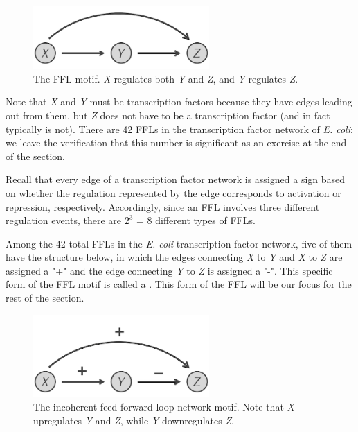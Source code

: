 \begin{figure}[h]
\centering
\mySfFamily
\includegraphics[width = 0.6\textwidth]{../assets/images/600px/feed-forward_loop.png}
\caption{The FFL motif. \textit{X} regulates both \textit{Y} and \textit{Z}, and \textit{Y} regulates \textit{Z}.}
\label{fig:feed-forward_loop}
\end{figure}

Note that \textit{X} and \textit{Y} must be transcription factors because they have edges leading out from them, but \textit{Z} does not have to be a transcription factor (and in fact typically is not). There are 42 FFLs in the transcription factor network of \textit{E. coli}; we leave the verification that this number is significant as an exercise at the end of the section.

Recall that every edge of a transcription factor network is assigned a sign based on whether the regulation represented by the edge corresponds to activation or repression, respectively. Accordingly, since an FFL involves three different regulation events, there are $2^3$ = 8 different types of FFLs.

Among the 42 total FFLs in the \textit{E. coli} transcription factor network, five of them have the structure below, in which the edges connecting \textit{X} to \textit{Y} and \textit{X} to \textit{Z} are assigned a "+" and the edge connecting \textit{Y} to \textit{Z} is assigned a "-". This specific form of the FFL motif is  called a . This form of the FFL will be our focus for the rest of the section.

\begin{qbox}\end{qbox} 

\begin{figure}[h]
\centering
\mySfFamily
\includegraphics[width = 0.6\textwidth]{../assets/images/600px/type-1_incoherent_feed-forward_loop.png}
\caption{The incoherent feed-forward loop network motif. Note that \textit{X} upregulates \textit{Y} and \textit{Z}, while \textit{Y} downregulates \textit{Z}.}
\label{fig:type-1_incoherent_feed-forward_loop}
\end{figure}

